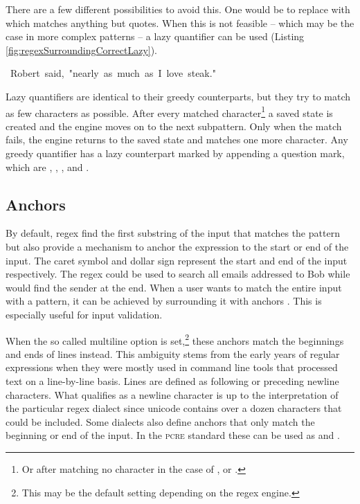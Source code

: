 There are a few different possibilities to avoid this. One would be to replace  with \pattern{[\caret "]} which matches anything but quotes. When this is not feasible -- which may be the case in more complex patterns -- a lazy quantifier  can be used (Listing \ref{fig:regexSurroundingCorrectLazy}). 


\begin{listingBox}[title={Correct use of lazy quantifier \pattern{".*?"}},label=fig:regexSurroundingCorrectLazy,width=12cm,center]
    \hspace{-5mm}~Robert~said,~"nearly~as~much~as~I~love~steak."
\end{listingBox}

Lazy quantifiers are identical to their greedy counterparts, but they try to match as few characters as possible. After every matched character\footnote{Or after matching no character in the case of ,  or .} a saved state is created and the engine moves on to the next subpattern. Only when the match fails, the engine returns to the saved state and matches one more character. Any greedy quantifier has a lazy counterpart marked by appending a question mark, which are , , ,  and .

\subsection{Anchors} \label{sec:introAnchors}

By default, regex find the first substring of the input that matches the pattern but also provide a mechanism to anchor the expression to the start or end of the input. The caret symbol \pattern{\caret} and dollar sign \pattern{\dollar} represent the start and end of the input respectively. The regex  could be used to search all emails addressed to Bob while  would find the sender at the end. When a user wants to match the entire input with a pattern, it can be achieved by surrounding it with anchors \pattern{\caret\placeholder\dollar}. This is especially useful for input validation.

When the so called multiline option is set,\footnote{This may be the default setting depending on the regex engine.} these anchors match the beginnings and ends of lines instead. This ambiguity stems from the early years of regular expressions when they were mostly used in command line tools that processed text on a line-by-line basis. Lines are defined as following or preceding newline characters. What qualifies as a newline character is up to the interpretation of the particular regex dialect since unicode contains over a dozen characters that could be included. Some dialects also define anchors that only match the beginning or end of the input. In the \textsc{pcre} standard these can be used as  and .

